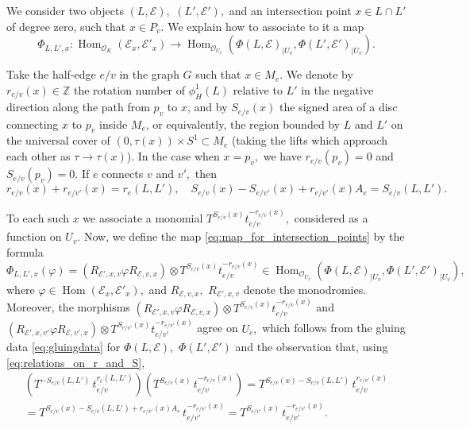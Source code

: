 \documentclass[11pt,leqno]{amsart}
\numberwithin{equation}{section}
\def\Z{\mathbb{Z}}
\def\Hom{\operatorname{Hom}}
\newcommand{\cO}{{\mathcal O}}
\newcommand{\cE}{{\mathcal E}}
\begin{document}
We consider two objects $(L,\cE),$ $(L',\cE'),$ and an intersection point $x\in L\cap L'$ of degree zero, such that $x\in P_v.$ 
We explain how to associate to it a map 
\begin{equation}\label{eq:map_for_intersection_points}\Phi_{L,L',x}:\Hom_{\cO_K}(\cE_x,\cE'_x)\to \Hom_{\cO_{U_v}}(\Phi(L,\cE)_{\mid U_v},\Phi(L',\cE')_{\mid U_v}).\end{equation}

Take the half-edge $e/v$ in the graph $G$ such that $x\in M_e.$ 
We denote by $r_{e/v}(x)\in \Z$ the rotation number of
$\phi_H^1(L)$ relative to $L'$ in the negative direction along the path from
$p_v$ to $x$, and by $S_{e/v}(x)$ the signed area of a disc connecting $x$ to $p_v$ inside $M_e$, or equivalently, the region bounded by $L$ and $L'$ on
the universal cover of $(0,\tau(x))\times S^1\subset M_e$ (taking the lifts which approach each other as $\tau\to \tau(x)$).
In the case when $x=p_v,$ we have $r_{e/v}(p_v)=0$ and $S_{e/v}(p_v)=0$. 
If $e$ connects $v$ and $v',$ then
\begin{equation}\label{eq:relations_on_r_and_S}r_{e/v}(x)+r_{e/v'}(x)=r_{e}(L,L'),\quad S_{e/v}(x)-S_{e/v'}(x)+r_{e/v'}(x)A_e=S_{e/v}(L,L').\end{equation}

To each such $x$ we associate a monomial $T^{S_{e/v}(x)}t_{e/v}^{-r_{e/v}(x)},$ considered as a function on $U_v.$ Now, we define the map \eqref{eq:map_for_intersection_points} by the formula 
\begin{equation}\label{eq:monomial_for_a_point}\Phi_{L,L',x}(\varphi)=(R_{\cE',x,v}\varphi R_{\cE,v,x})\otimes T^{S_{e/v}(x)}t_{e/v}^{-r_{e/v}(x)}\in \Hom_{\cO_{U_v}}(\Phi(L,\cE)_{\mid U_v},\Phi(L',\cE')_{\mid U_v}),\end{equation} where $\varphi\in\Hom(\cE_x,\cE'_x),$ and $R_{\cE,v,x},$ $R_{\cE',x,v}$ denote the monodromies. Moreover, the morphisms $(R_{\cE',x,v}\varphi R_{\cE,v,x})\otimes T^{S_{e/v}(x)}t_{e/v}^{-r_{e/v}(x)}$ and $(R_{\cE',x,v'}\varphi R_{\cE,v',x})\otimes T^{S_{e/v'}(x)}t_{e/v'}^{-r_{e/v'}(x)}$
agree on $U_e,$ which follows from the gluing data \eqref{eq:gluingdata} for $\Phi(L,\cE),$ $\Phi(L',\cE')$ and
the observation that, using \eqref{eq:relations_on_r_and_S},
\begin{multline*} \left(T^{-S_{e/v}(L,L')}\, t_{e/v}^{r_e(L,L')}\right)\left(T^{S_{e/v}(x)}\,t_{e/v}^{-r_{e/v}(x)}\right) =
T^{S_{e/v}(x)-S_{e/v}(L,L')}\, t_{e/v}^{r_{e/v'}(x)}\\=T^{S_{e/v}(x)-S_{e/v}(L,L')+r_{e/v'}(x)A_e}
\,t_{e/v'}^{-r_{e/v'}(x)}=T^{S_{e/v'}(x)} \,t_{e/v'}^{-r_{e/v'}(x)}.\end{multline*}
\end{document}
